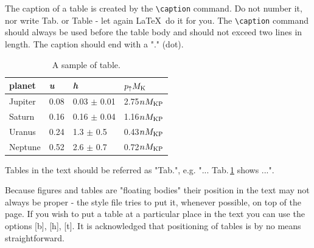 \documentclass{caosp306}
\begin{document}
%
%
The caption of a table is created by the \verb|\caption| command. Do not number
it, nor write Tab. or Table - let again \LaTeX~do it for you.  The
\verb|\caption| command should always be used before the table body and should
not exceed two lines in length. The caption should end with a "." (dot).

\begin{table}[htbp]
\begin{center}
	\caption{A sample of table.}
	\label{tab:t1}
	\begin{tabular}{llll}
		\hline\hline
		planet  &{\it u}&    {\it h}      & $p_{\uparrow}M_{\rm K}$\\
		\hline
		Jupiter & 0.08  & 0.03 $\pm$ 0.01 & 2.75$nM_{\rm KP}$ \\
		Saturn  & 0.16  & 0.16 $\pm$ 0.04 & 1.16$nM_{\rm KP}$ \\
		Uranus  & 0.24  & 1.3  $\pm$ 0.5  & 0.43$nM_{\rm KP}$ \\
		Neptune & 0.52  & 2.6  $\pm$ 0.7  & 0.72$nM_{\rm KP}$ \\
		\hline\hline
	\end{tabular}
\end{center}
\end{table}

Tables in the text should be referred as "Tab.", e.g. "... Tab.\,\ref{tab:t1} shows ...". 

Because figures and tables are "floating bodies" their position in the text may not
always be proper - the style file tries to put it, whenever possible, on
top of the page. If you wish to put a table at a particular place in the
text you can use the options [b], [h], [t]. It is acknowledged that
positioning of tables is by no means straightforward.
\end{document}

